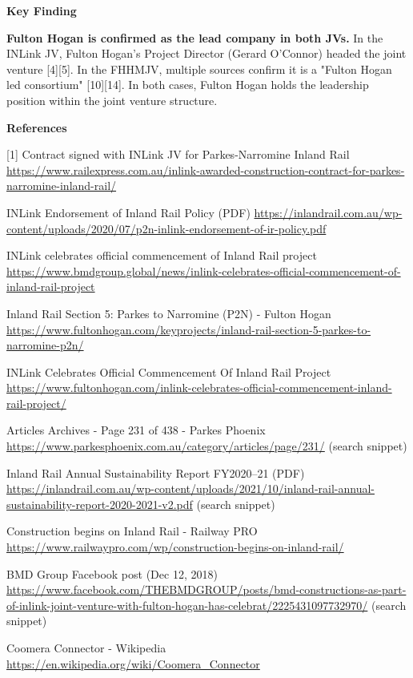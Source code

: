 \documentclass[table]{gtech}
\begin{document}
\begin{tcolorbox}
\smallskip\noindent\textbf{Key Finding}\par\smallskip

\textbf{Fulton Hogan is confirmed as the lead company in both JVs.} In the INLink JV, Fulton Hogan's Project Director (Gerard O'Connor) headed the joint venture [4][5]. In the FHHMJV, multiple sources confirm it is a "Fulton Hogan led consortium" [10][14]. In both cases, Fulton Hogan holds the leadership position within the joint venture structure.

\smallskip\noindent\textbf{References}\par\footnotesize\setlength{\parindent}{0pt}\setlength{\parskip}{2.5pt}
[1] Contract signed with INLink JV for Parkes-Narromine Inland Rail \url{https://www.railexpress.com.au/inlink-awarded-construction-contract-for-parkes-narromine-inland-rail/}\par
[2] INLink Endorsement of Inland Rail Policy (PDF) \url{https://inlandrail.com.au/wp-content/uploads/2020/07/p2n-inlink-endorsement-of-ir-policy.pdf}\par
[3] INLink celebrates official commencement of Inland Rail project \url{https://www.bmdgroup.global/news/inlink-celebrates-official-commencement-of-inland-rail-project}\par
[4] Inland Rail Section 5: Parkes to Narromine (P2N) - Fulton Hogan \url{https://www.fultonhogan.com/keyprojects/inland-rail-section-5-parkes-to-narromine-p2n/}\par
[5] INLink Celebrates Official Commencement Of Inland Rail Project \url{https://www.fultonhogan.com/inlink-celebrates-official-commencement-inland-rail-project/}\par
[6] Articles Archives - Page 231 of 438 - Parkes Phoenix \url{https://www.parkesphoenix.com.au/category/articles/page/231/} (search snippet)\par
[7] Inland Rail Annual Sustainability Report FY2020--21 (PDF) \url{https://inlandrail.com.au/wp-content/uploads/2021/10/inland-rail-annual-sustainability-report-2020-2021-v2.pdf} (search snippet)\par
[8] Construction begins on Inland Rail - Railway PRO \url{https://www.railwaypro.com/wp/construction-begins-on-inland-rail/}\par
[9] BMD Group Facebook post (Dec 12, 2018) \url{https://www.facebook.com/THEBMDGROUP/posts/bmd-constructions-as-part-of-inlink-joint-venture-with-fulton-hogan-has-celebrat/2225431097732970/} (search snippet)\par
[10] Coomera Connector - Wikipedia \url{https://en.wikipedia.org/wiki/Coomera_Connector}\par

\end{tcolorbox}
\end{document}
